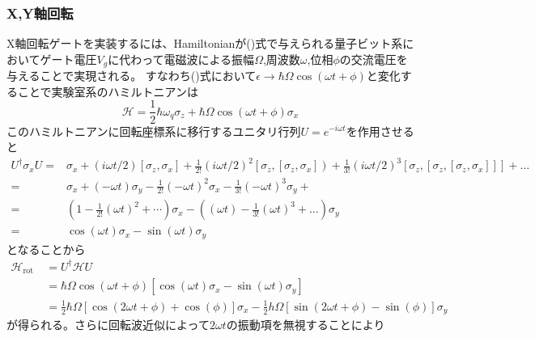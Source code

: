         \subsubsection{X,Y軸回転}
        X軸回転ゲートを実装するには、Hamiltonianが()式で与えられる量子ビット系においてゲート電圧$V_g$に代わって電磁波による振幅$\Omega$,周波数$\omega$,位相$\phi$の交流電圧を与えることで実現される。
        すなわち()式において$\epsilon \to \hbar\Omega \cos(\omega t + \phi)$と変化することで実験室系のハミルトニアンは
        \begin{equation}
            \mathcal{H}=\frac{1}{2}\hbar \omega_{q} \sigma_{z}+ \hbar \Omega \cos(\omega t + \phi)\sigma_{x}
        \end{equation}
        このハミルトニアンに回転座標系に移行するユニタリ行列$U=e^{-i\omega t}$を作用させると
        \begin{equation}
            \begin{aligned}
            U^{\dagger} \sigma_{x} U=&\sigma_{x}+(i \omega t / 2)\left[\sigma_{z}, \sigma_{x}\right]+\frac{1}{2 !}(i \omega t / 2)^{2}\left[\sigma_{z},\left[\sigma_{z}, \sigma_{x}\right]\right)+\frac{1}{3 !}(i \omega t / 2)^{3}\left[\sigma_{z},\left[\sigma_{z},\left[\sigma_{z}, \sigma_{x}\right]\right]\right]+\ldots \\
            =& \sigma_{x}+(-\omega t) \sigma_{y}-\frac{1}{2 !}(-\omega t)^{2} \sigma_{x}-\frac{1}{3 !}(-\omega t)^{3} \sigma_{y}+\\
            =&\left(1-\frac{1}{2 !}(\omega t)^{2}+\cdots\right) \sigma_{x}-\left((\omega t)-\frac{1}{3 !}(\omega t)^{3}+\ldots\right) \sigma_{y} \\
            =& \cos (\omega t) \sigma_{x}-\sin (\omega t) \sigma_{y}
            \end{aligned}
        \end{equation}
        となることから
        \begin{equation}
            \begin{aligned}
            \mathcal{H}_{\text {rot }} &=U^{\dagger} \mathcal{H} U \\
            &=\hbar \Omega \cos (\omega t+\phi)\left[\cos (\omega t) \sigma_{x}-\sin (\omega t) \sigma_{y}\right] \\
            &=\frac{1}{2} \hbar \Omega[\cos (2 \omega t+\phi)+\cos (\phi)] \sigma_{x}-\frac{1}{2} h \Omega[\sin (2 \omega t+\phi)-\sin (\phi)] \sigma_{y}
            \end{aligned}
        \end{equation}
        が得られる。さらに回転波近似によって$2\omega t$の振動項を無視することにより
